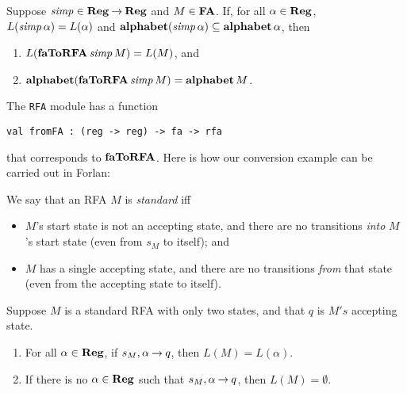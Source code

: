 \begin{proposition}
Suppose ${\it simp}\in\mathbf{Reg}\mathbin{\to}\mathbf{Reg}$ and $M\in\mathbf{FA}$.  If, for all
$\alpha\in\mathbf{Reg}$, $L({\it simp}\,\alpha)=L(\alpha)$ and
$\mathbf{alphabet}({\it simp}\,\alpha)\subseteq\mathbf{alphabet}\,\alpha$, then
\begin{enumerate}[\quad(1)]
\item $L(\mathbf{faToRFA}\,{\it simp}\,M) = L(M)$, and

\item $\mathbf{alphabet}(\mathbf{faToRFA}\,{\it simp}\,M) = \mathbf{alphabet}\,M$.
\end{enumerate}
\end{proposition}

The \texttt{RFA} module has a function
\begin{verbatim}
val fromFA : (reg -> reg) -> fa -> rfa
\end{verbatim}
%
that corresponds to $\mathbf{faToRFA}$.
Here is how our conversion example can be carried out in Forlan:


We say that an RFA $M$ is \emph{standard} iff
\begin{itemize}
\item $M$'s start state is not an accepting state, and there are no
  transitions \emph{into} $M$'s start state (even from $s_M$ to
  itself); and

\item $M$ has a single accepting state, and there are no transitions
  \emph{from} that state (even from the accepting state to itself).
\end{itemize}

%
\begin{proposition}
Suppose $M$ is a standard RFA with only two states,
and that $q$ is $M's$ accepting state.
\begin{enumerate}[\quad(1)]
\item For all $\alpha\in\mathbf{Reg}$, if $s_M,\alpha\mathbin{\to} q$, then
  $L(M) = L(\alpha)$.

\item If there is no $\alpha\in\mathbf{Reg}$ such that $s_M,\alpha\mathbin{\to} q$,
  then $L(M) = \emptyset$.
\end{enumerate}
\end{proposition}

